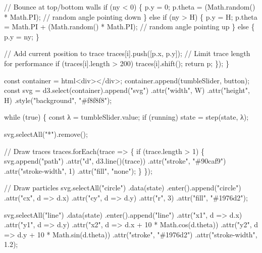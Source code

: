 \documentclass[
  letterpaper,
  enabledeprecatedfontcommands]{report}
\newenvironment{Shaded}{\begin{snugshade}}{\end{snugshade}}
\newcommand{\NormalTok}[1]{\textcolor[rgb]{0.00,0.23,0.31}{#1}}
\begin{document}
\begin{Shaded}
\begin{Highlighting}[]
\NormalTok{            // Bounce at top/bottom walls}
\NormalTok{            if (ny \textless{} 0) \{}
\NormalTok{                p.y = 0;}
\NormalTok{                p.theta = (Math.random() * Math.PI); // random angle pointing down}
\NormalTok{            \} else if (ny \textgreater{} H) \{}
\NormalTok{                p.y = H;}
\NormalTok{                p.theta = Math.PI + (Math.random() * Math.PI); // random angle pointing up}
\NormalTok{            \} else \{}
\NormalTok{                p.y = ny;}
\NormalTok{            \}}

\NormalTok{            // Add current position to trace}
\NormalTok{            traces[i].push([p.x, p.y]);}
\NormalTok{            // Limit trace length for performance}
\NormalTok{            if (traces[i].length \textgreater{} 200) traces[i].shift();}
\NormalTok{            return p;}
\NormalTok{        \});}
\NormalTok{    \}}

\NormalTok{    const container = html\textasciigrave{}\textless{}div\textgreater{}\textless{}/div\textgreater{}\textasciigrave{};}
\NormalTok{    container.append(tumbleSlider, button);}
\NormalTok{    const svg = d3.select(container).append("svg")}
\NormalTok{        .attr("width", W)}
\NormalTok{        .attr("height", H)}
\NormalTok{        .style("background", "\#f8f8f8");}

\NormalTok{    while (true) \{}
\NormalTok{        const λ = tumbleSlider.value;}
\NormalTok{        if (running) state = step(state, λ);}

\NormalTok{        svg.selectAll("*").remove();}

\NormalTok{        // Draw traces}
\NormalTok{        traces.forEach(trace =\textgreater{} \{}
\NormalTok{            if (trace.length \textgreater{} 1) \{}
\NormalTok{                svg.append("path")}
\NormalTok{                    .attr("d", d3.line()(trace))}
\NormalTok{                    .attr("stroke", "\#90caf9")}
\NormalTok{                    .attr("stroke{-}width", 1)}
\NormalTok{                    .attr("fill", "none");}
\NormalTok{            \}}
\NormalTok{        \});}

\NormalTok{        // Draw particles}
\NormalTok{        svg.selectAll("circle")}
\NormalTok{            .data(state)}
\NormalTok{            .enter().append("circle")}
\NormalTok{            .attr("cx", d =\textgreater{} d.x)}
\NormalTok{            .attr("cy", d =\textgreater{} d.y)}
\NormalTok{            .attr("r", 3)}
\NormalTok{            .attr("fill", "\#1976d2");}

\NormalTok{        svg.selectAll("line")}
\NormalTok{            .data(state)}
\NormalTok{            .enter().append("line")}
\NormalTok{            .attr("x1", d =\textgreater{} d.x)}
\NormalTok{            .attr("y1", d =\textgreater{} d.y)}
\NormalTok{            .attr("x2", d =\textgreater{} d.x + 10 * Math.cos(d.theta))}
\NormalTok{            .attr("y2", d =\textgreater{} d.y + 10 * Math.sin(d.theta))}
\NormalTok{            .attr("stroke", "\#1976d2")}
\NormalTok{            .attr("stroke{-}width", 1.2);}


\end{Highlighting}
\end{Shaded}
\end{document}
